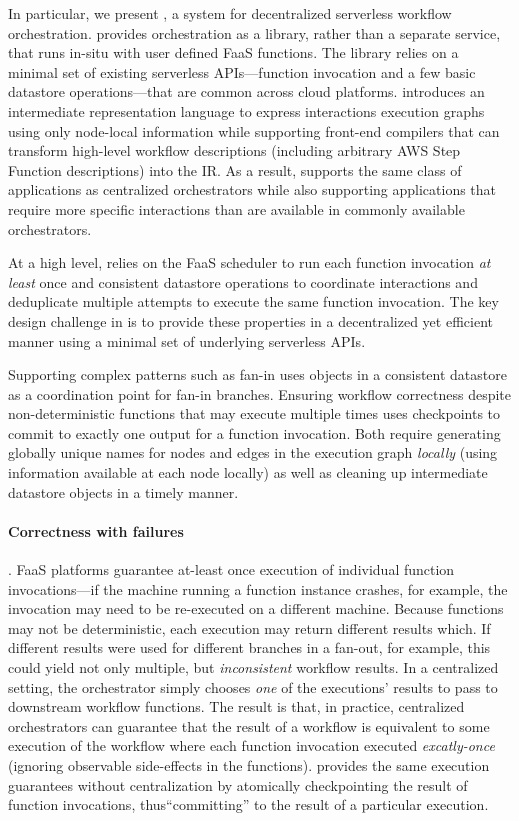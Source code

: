 In particular, we present \name{}, a system for decentralized serverless
workflow orchestration. \name{} provides orchestration as a library, rather than
a separate service, that runs in-situ with user defined FaaS functions. The
library relies on a minimal set of existing serverless APIs---function
invocation and a few basic datastore operations---that are common across cloud
platforms. \name{} introduces an intermediate representation language to express
interactions execution graphs using only node-local information while supporting
front-end compilers that can transform high-level workflow descriptions
(including arbitrary AWS Step Function descriptions) into the IR. As a result,
\name{} supports the same class of applications as centralized orchestrators
while also supporting applications that require more specific interactions than
are available in commonly available orchestrators.

At a high level, \name{} relies on the FaaS scheduler to run each function
invocation \emph{at least} once and consistent datastore operations to
coordinate interactions and deduplicate multiple attempts to execute the same
function invocation. The key design challenge in \name{} is to provide these
properties in a decentralized yet efficient manner using a minimal set of
underlying serverless APIs.

Supporting complex patterns such as fan-in uses objects in a consistent
datastore as a coordination point for fan-in branches. Ensuring workflow
correctness despite non-deterministic functions that may execute multiple times
uses checkpoints to commit to exactly one output for a function invocation. Both
require generating globally unique names for nodes and edges in the execution
graph \emph{locally} (using information available at each node locally) as well
as cleaning up intermediate datastore objects in a timely manner.

\paragraph{Correctness with failures}. FaaS platforms guarantee at-least once
execution of individual function invocations---if the machine running a function
instance crashes, for example, the invocation may need to be re-executed on a
different machine. Because functions may not be deterministic, each execution
may return different results which. If different results were used for different
branches in a fan-out, for example, this could yield not only multiple, but
\emph{inconsistent} workflow results. In a centralized setting, the orchestrator
simply chooses \emph{one} of the executions' results to pass to downstream
workflow functions. The result is that, in practice, centralized orchestrators
can guarantee that the result of a workflow is equivalent to some execution of
the workflow where each function invocation executed \emph{excatly-once}
(ignoring observable side-effects in the functions).  \name{} provides the same
execution guarantees without centralization by atomically checkpointing the
result of function invocations, thus``committing'' to the result of a particular
execution.

